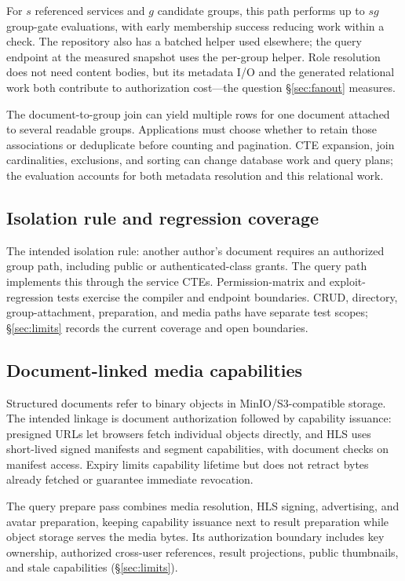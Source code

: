 \documentclass[sigconf, nonacm]{acmart}
\begin{document}
For $s$ referenced services and $g$ candidate groups, this path performs up
to $s g$ group-gate evaluations, with early membership success reducing work
within a check. The repository also has a batched helper used elsewhere; the
query endpoint at the measured snapshot uses the per-group helper. Role
resolution does not need content bodies, but its metadata I/O and the
generated relational work both contribute to authorization cost---the
question \S\ref{sec:fanout} measures.

The document-to-group join can yield multiple rows for one document attached
to several readable groups. Applications must choose whether to retain those
associations or deduplicate before counting and pagination. CTE expansion,
join cardinalities, exclusions, and sorting can change database work and
query plans; the evaluation accounts for both metadata resolution and this
relational work.

\subsection{Isolation rule and regression coverage}

The intended isolation rule: another author's document requires an
authorized group path, including public or authenticated-class grants. The
query path implements this through the service CTEs. Permission-matrix and
exploit-regression tests exercise the compiler and endpoint boundaries.
CRUD, directory, group-attachment, preparation, and media paths have
separate test scopes; \S\ref{sec:limits} records the current coverage and
open boundaries.

\subsection{Document-linked media capabilities}

Structured documents refer to binary objects in MinIO/S3-compatible storage.
The intended linkage is document authorization followed by capability
issuance: presigned URLs let browsers fetch individual objects directly, and
HLS uses short-lived signed manifests and segment capabilities, with
document checks on manifest access. Expiry limits capability lifetime but
does not retract bytes already fetched or guarantee immediate revocation.

The query prepare pass combines media resolution, HLS signing, advertising,
and avatar preparation, keeping capability issuance next to result
preparation while object storage serves the media bytes. Its authorization
boundary includes key ownership, authorized cross-user references, result
projections, public thumbnails, and stale capabilities
(\S\ref{sec:limits}).
\end{document}

